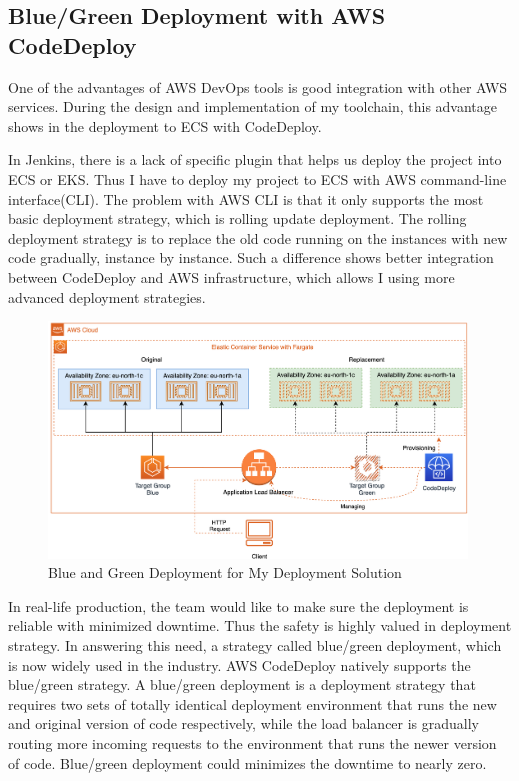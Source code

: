 \subsection{Blue/Green Deployment with AWS CodeDeploy}
One of the advantages of AWS DevOps tools is good integration with other AWS services. During the design and implementation of my toolchain, this advantage shows in the deployment to ECS with CodeDeploy.
\par
In Jenkins, there is a lack of specific plugin that helps us deploy the project into ECS or EKS. Thus I have to deploy my project to ECS with AWS command-line interface(CLI). The problem with AWS CLI is that it only supports the most basic deployment strategy, which is rolling update deployment. The rolling deployment strategy is to replace the old code running on the instances with new code gradually, instance by instance.
Such a difference shows better integration between CodeDeploy and AWS infrastructure, which allows I using more advanced deployment strategies. 
\begin{figure}[h]
 \centering
 \includegraphics[width=0.99\textwidth]{pics/bg.png}
 \caption{Blue and Green Deployment for My Deployment Solution}
 \label{fig:bg}
\end{figure}
\par
In real-life production, the team would like to make sure the deployment is reliable with minimized downtime. Thus the safety is highly valued in deployment strategy. In answering this need, a strategy called blue/green deployment, which is now widely used in the industry. AWS CodeDeploy natively supports the blue/green strategy.
A blue/green deployment is a deployment strategy that requires two sets of totally identical deployment environment that runs the new and original version of code respectively, while the load balancer is gradually routing more incoming requests to the environment that runs the newer version of code. Blue/green deployment could minimizes the downtime to nearly zero\cite{10.1007/978-3-030-45989-5_6}.
